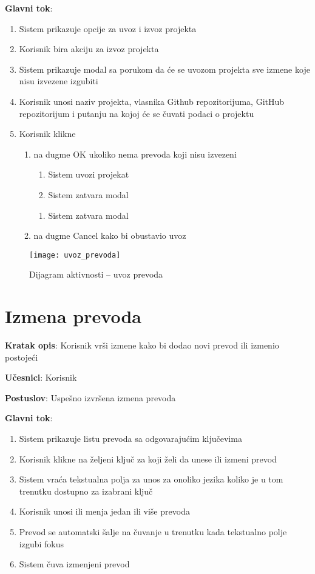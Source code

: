 \textbf{Glavni tok}:
\begin{enumerate}
    \item Sistem prikazuje opcije za uvoz i izvoz projekta
    \item Korisnik bira akciju za izvoz projekta
    \item Sistem prikazuje modal sa porukom da će se uvozom projekta sve 
    izmene koje nisu izvezene izgubiti
    \item Korisnik unosi naziv projekta, vlasnika Github repozitorijuma, 
    GitHub repozitorijum i putanju na kojoj će se čuvati podaci o projektu
    \item Korisnik klikne
    \begin{enumerate}
        \item na dugme OK ukoliko nema prevoda koji nisu izvezeni
        \begin{enumerate}
            \item Sistem uvozi projekat
            \item Sistem zatvara modal
        \end{enumerate}        
        \begin{enumerate}
            \item Sistem zatvara modal
        \end{enumerate}        
        \item na dugme Cancel kako bi obustavio uvoz
    \end{enumerate}        
    
\end{enumerate}

\begin{figure}[H]
    \centering
    \texttt{[image: uvoz\_prevoda]}
    \caption{Dijagram aktivnosti -- uvoz prevoda}
\end{figure}


\section{Izmena prevoda}

\textbf{Kratak opis}: Korisnik vrši izmene kako bi dodao novi prevod ili izmenio postojeći

\textbf{Učesnici}: Korisnik

\textbf{Postuslov}: Uspešno izvršena izmena prevoda

\textbf{Glavni tok}:
\begin{enumerate}
    \item Sistem prikazuje listu prevoda sa odgovarajućim ključevima
    \item Korisnik klikne na željeni ključ za koji želi da unese ili izmeni prevod
    \item Sistem vraća tekstualna polja za unos za onoliko jezika koliko je u tom 
    trenutku dostupno za izabrani ključ
    \item Korisnik unosi ili menja jedan ili više prevoda
    \item Prevod se automatski šalje na čuvanje u trenutku kada tekstualno polje izgubi fokus
    \item Sistem čuva izmenjeni prevod
\end{enumerate}

